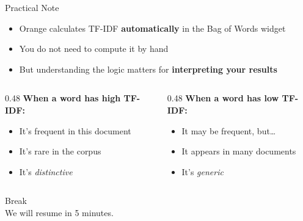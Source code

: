 \documentclass[aspectratio=169,11pt]{beamer}
\begin{document}
\begin{frame}{Practical Note}
    \begin{itemize}
        \item Orange calculates TF-IDF \textbf{automatically} in the Bag of Words widget
        \item You do not need to compute it by hand
        \item But understanding the logic matters for \textbf{interpreting your results}
    \end{itemize}

    \vspace{0.5cm}

    \begin{columns}[T]
        \begin{column}{0.48\textwidth}
            \textbf{When a word has high TF-IDF:}
            \begin{itemize}
                \item It's frequent in this document
                \item It's rare in the corpus
                \item It's \textit{distinctive}
            \end{itemize}
        \end{column}
        \begin{column}{0.48\textwidth}
            \textbf{When a word has low TF-IDF:}
            \begin{itemize}
                \item It may be frequent, but\ldots
                \item It appears in many documents
                \item It's \textit{generic}
            \end{itemize}
        \end{column}
    \end{columns}
\end{frame}


\begin{frame}[plain]
    \begin{center}
        \vspace{2cm}
        {\Huge Break}\\[1cm]
        {\large We will resume in 5 minutes.}
        \vspace{2cm}
    \end{center}
\end{frame}
\end{document}
